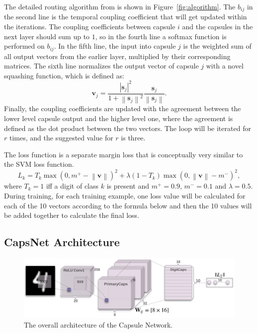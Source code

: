 \documentclass{article}
\begin{document}
The detailed routing algorithm from \cite{sabour2017dynamic} is shown in Figure~\ref{fig:algorithm}. The $b_{ij}$ in the second line is the temporal coupling coefficient that will get updated within the iterations. The coupling coefficients between capsule $i$ and the capsules in the next layer should sum up to $1$, so in the fourth line a softmax function is performed on $b_{ij}$. In the fifth line, the input into capsule $j$ is the weighted sum of all output vectors from the earlier layer, multiplied by their corresponding matrices. The sixth line normalizes the output vector of capsule $j$ with a novel squashing function, which is defined as:
$$
\mathbf{v}_j = \frac{\left|\mathbf{s}_j\right|^2}{1 + \left\| \mathbf{s}_j\right\|^2}\frac{\mathbf{s}_j}{\left\| \mathbf{s}_j\right\|}.
$$
Finally, the coupling coefficients are updated with the agreement between the lower level capsule output and the higher level one, where the agreement is defined as the dot product between the two vectors. The loop will be iterated for $r$ times, and the suggested value for $r$ is three.

The loss function is a separate margin loss that is conceptually very similar to the SVM loss function. 
$$
L_k = T_k \max(0, m^+ - \left\| \mathbf{v}\right\|)^2 + \lambda (1-T_k) \max (0, \left\| \mathbf{v} \right\| - m^-)^2,
$$
where $T_k = 1$ iff a digit of class $k$ is present and $m^+ = 0.9$, $m^-=0.1$ and $\lambda = 0.5$. During training, for each training example, one loss value will be calculated for each of the 10 vectors according to the formula below and then the 10 values will be added together to calculate the final loss. 

\subsection{CapsNet Architecture}

\begin{figure}[!htb]
	\centering\includegraphics[width=\textwidth]{fig//architecture}
	\caption{The overall architecture of the Capsule Network.}\label{fig:architecture}
\end{figure}
\end{document}
